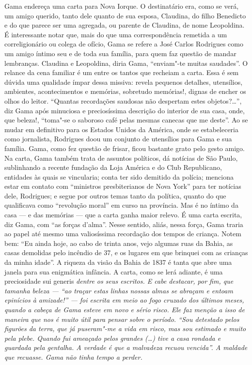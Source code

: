 {\small\noindent
Gama endereça uma carta para Nova Iorque. O destinatário era, como
se verá, um amigo querido, tanto dele quanto de sua esposa, Claudina, do
filho Benedicto e do que parece ser uma agregada, ou parente de
Claudina, de nome Leopoldina. É interessante notar que, mais do que uma
correspondência remetida a um correligionário ou colega de ofício, Gama
se refere a José Carlos Rodrigues como um amigo íntimo seu e de toda sua
família, para quem faz questão de mandar lembranças. Claudina e
Leopoldina, diria Gama, ``enviam"-te muitas saudades''. O relance da cena
familiar é um entre os tantos que recheiam a carta. Essa é sem dúvida
uma qualidade ímpar dessa missiva: revela pequenos detalhes, utensílios,
ambientes, acontecimentos e memórias, sobretudo memórias!, dignas de
encher os olhos do leitor. ``Quantas recordações saudosas não despertam
estes objetos?\ldots{}'', diz Gama após minuciosa e preciosíssima descrição do
interior de sua casa, onde, que beleza!, ``toma"-se o saboroso café pelas
mesmas canecas que me deste''. Ao se mudar em definitivo para os Estados
Unidos da América, onde se estabeleceria como jornalista, Rodrigues doou
um conjunto de utensílios para Gama e sua família. Gama, como fez
questão de frisar, ficou bastante grato pelo gesto amigo. Na carta, Gama
também trata de assuntos políticos, dá notícias de São Paulo,
sublinhando a recente fundação da Loja América e do Club Republicano,
entidades às quais se vincularia; conta ter sido demitido da
polícia; menciona estar em contato com ``ministros presbiterianos de Nova
York'' para ter notícias dele, Rodrigues; e segue por outros temas tanto da
política, quanto do que qualificava como
``revolução moral'' em curso na província. Mas é no íntimo da casa --- e
das memórias --- que a carta ganha maior relevo. É uma carta escrita, diz
Gama, com ``as forças d'alma''. Nesse sentido, aliás, nessa força, Gama
traria ao papel até mesmo uma valiosíssima recordação dos tempos de
criança. Notem bem: ``Eu ainda hoje, ao cabo de trinta anos, vejo algumas
ruas da Bahia, as casas demolidas pelo incêndio de 37, e os lugares em
que brinquei com as crianças da minha idade''. A riqueza da visão da
Bahia de 1837 é tanta que abre uma janela para sua enigmática infância.
A carta, como se lerá adiante, é uma preciosidade} sui generis
\emph{dentre os seus escritos. E cabe destacar, por fim, que tamanha
beleza --- ``ao traçar estas linhas nossas almas se abraçam e entoam
epinícios à amizade!'' --- foi escrita em meio ao fogo cruzado dos últimos
meses, quando a cabeça de Gama esteve em novo e sério risco. Ele faz
menção a isso de maneira que nos é muito útil para pensar sobre o
período. ``Sou detestado pelos figurões da terra, que já puseram"-me a
vida em risco, mas sou estimado e muito pela plebe. Quando fui ameaçado
pelos grandes (\ldots{}) tive a casa rondada e guardada pela gentalha. A
verdade é que a malvadeza recuou vencida''. A maldade que recuasse. Gama
não tinha tempo a perder.}

